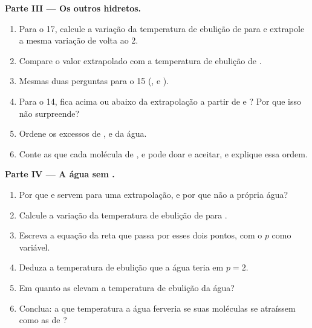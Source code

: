 \begin{problem}
\medskip
\noindent\textbf{Parte III --- Os outros hidretos.}
\begin{enumerate}[resume]
  \item Para o  17, calcule a variação da temperatura de ebulição de
         para  e extrapole a mesma variação de volta ao
         2.
  \item Compare o valor extrapolado com a temperatura de ebulição de .
  \item Mesmas duas perguntas para o  15 (,  e
        ).
  \item Para o  14,  fica acima ou abaixo da extrapolação a
        partir de  e ? Por que isso não surpreende?
  \item Ordene os excessos de ,  e da água.
  \item Conte as  que cada molécula de ,
         e  pode doar e aceitar, e explique essa ordem.
\end{enumerate}

\medskip
\noindent\textbf{Parte IV --- A água sem .}
\begin{enumerate}[resume]
  \item Por que  e  servem para uma extrapolação, e por
        que não a própria água?
  \item Calcule a variação da temperatura de ebulição de  para
        .
  \item Escreva a equação da reta que passa por esses dois pontos, com o
         $p$ como variável.
  \item Deduza a temperatura de ebulição que a água teria em $p = 2$.
  \item Em quanto as  elevam a temperatura de
        ebulição da água?
  \item Conclua: a que temperatura a água ferveria se suas moléculas se
        atraíssem como as de ?
\end{enumerate}
\end{problem}
